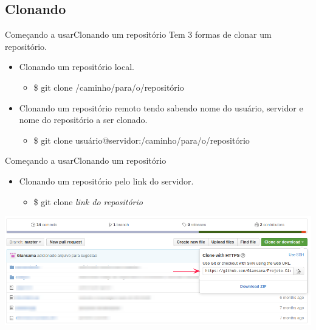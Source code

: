 \documentclass[10pt]{beamer}
\begin{document}
\subsection{Clonando}
\begin{frame}{Começando a usar}{Clonando um repositório}
	Tem 3 formas de clonar um repositório.
	\begin{itemize}
		\item Clonando um repositório local.
		\begin{itemize}
			\item \$ git clone /caminho/para/o/repositório		
		\end{itemize}
		\item Clonando um repositório remoto tendo sabendo nome do usuário, servidor e
				nome do repositório a ser clonado.
		\begin{itemize}
			\item \$ git clone usuário@servidor:/caminho/para/o/repositório		
		\end{itemize}
	\end{itemize}
\end{frame}
\begin{frame}{Começando a usar}{Clonando um repositório}
	\begin{itemize}
	\item Clonando um repositório pelo link do servidor.
	\begin{itemize}
		\item \$ git clone \textit{link do repositório}
	\end{itemize}
	\end{itemize}
	\includegraphics[scale=0.38]{AAUgraphics/clone1}\\
	
\end{frame}
\end{document}

